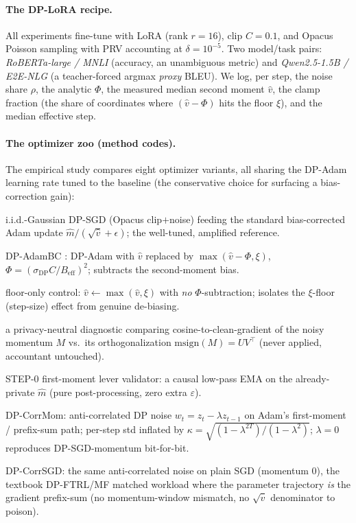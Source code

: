 \documentclass[11pt]{article}
\theoremstyle{plain}
\theoremstyle{definition}
\theoremstyle{remark}
\begin{document}
\paragraph{The DP-LoRA recipe.}
All experiments fine-tune with LoRA (rank $r{=}16$), clip $C{=}0.1$, and Opacus Poisson sampling
with PRV accounting at $\delta{=}10^{-5}$. Two model/task pairs: \emph{RoBERTa-large / MNLI}
(accuracy, an unambiguous metric) and \emph{Qwen2.5-1.5B / E2E-NLG} (a teacher-forced argmax
\emph{proxy} BLEU). We log, per step, the noise share $\rho$, the analytic $\Phi$, the measured
median second moment $\hat v$, the clamp fraction (the share of coordinates where $(\hat v-\Phi)$
hits the floor $\xi$), and the median effective step.

\paragraph{The optimizer zoo (method codes).}
The empirical study compares eight optimizer variants, all sharing the DP-Adam learning rate tuned
to the baseline (the conservative choice for surfacing a bias-correction gain):
\begin{description}[leftmargin=1.4em,itemsep=2pt,topsep=2pt]
\item[\texttt{dp-adam}] i.i.d.-Gaussian DP-SGD (Opacus clip$+$noise) feeding the standard
bias-corrected Adam update $\hat m/(\sqrt{\hat v}+\epsilon)$; the well-tuned, amplified reference.
\item[\texttt{dp-adambc}] DP-AdamBC \citep{tang2024dpadambc}: DP-Adam with $\hat v$ replaced by
$\max(\hat v-\Phi,\xi)$, $\Phi=(\sigma_{\mathrm{DP}}C/B_{\mathrm{eff}})^2$; subtracts the
second-moment bias.
\item[\texttt{dp-adam-}$\xi$] floor-only control: $\hat v\leftarrow\max(\hat v,\xi)$ with
\emph{no} $\Phi$-subtraction; isolates the $\xi$-floor (step-size) effect from genuine de-biasing.
\item[\texttt{muon-probe}] a privacy-neutral diagnostic comparing cosine-to-clean-gradient of the
noisy momentum $M$ vs.\ its orthogonalization $\mathrm{msign}(M)=UV^\top$ (never applied,
accountant untouched).
\item[\texttt{dp-adam-lp}] STEP-0 first-moment lever validator: a causal low-pass EMA on the
already-private $\hat m$ (pure post-processing, zero extra $\varepsilon$).
\item[\texttt{dp-corrmom}] DP-CorrMom: anti-correlated DP noise $w_t=z_t-\lambda z_{t-1}$ on Adam's
first-moment / prefix-sum path; per-step std inflated by $\kappa=\sqrt{(1-\lambda^{2T})/(1-\lambda^2)}$;
$\lambda{=}0$ reproduces DP-SGD-momentum bit-for-bit.
\item[\texttt{dp-corrsgd}] DP-CorrSGD: the same anti-correlated noise on plain SGD (momentum $0$),
the textbook DP-FTRL/MF matched workload where the parameter trajectory \emph{is} the gradient
prefix-sum (no momentum-window mismatch, no $\sqrt{\hat v}$ denominator to poison).
\end{description}
\end{document}
